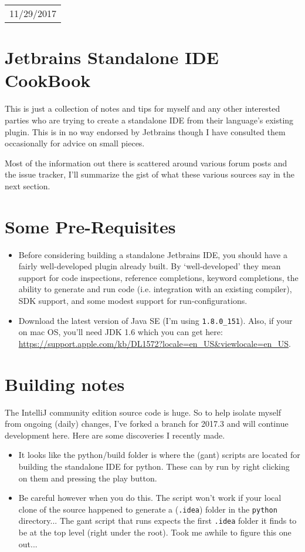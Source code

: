 \documentclass{article}[10pt]
\begin{document}
\null\hfill\begin{tabular}[t]{l@{}}
  11/29/2017
\end{tabular}

\section{Jetbrains Standalone IDE CookBook}

This is just a collection of notes and tips for myself and any other interested parties who are trying to create a standalone IDE from their language's existing plugin. This is in no way endorsed by Jetbrains though I have consulted them occasionally for advice on small pieces. 

Most of the information out there is scattered around various forum posts and the issue tracker, I'll summarize the gist of what these various sources say in the next section.

\section{Some Pre-Requisites}

\begin{itemize}
\item Before considering building a standalone Jetbrains IDE, you should have a fairly well-developed plugin already built. By `well-developed' they mean support for code inspections, reference completions, keyword completions, the ability to generate and run code (i.e. integration with an existing compiler), SDK support, and some modest support for run-configurations.

\item Download the latest version of Java SE (I'm using \verb|1.8.0_151|). Also, if your on mac OS, you'll need JDK 1.6 which you can get here: \url{https://support.apple.com/kb/DL1572?locale=en_US&viewlocale=en_US}.
\end{itemize}

\section{Building notes}

The IntelliJ community edition source code is huge. So to help isolate myself from ongoing (daily) changes, I've forked a branch for 2017.3 and will continue development here. Here are some discoveries I recently made.

\begin{itemize}
\item It looks like the python/build folder is where the (gant) scripts are located for building the standalone IDE for python. These can by run by right clicking on them and pressing the play button.
\item Be careful however when you do this. The script won't work if your local clone of the source happened to generate a (\texttt{.idea}) folder in the \texttt{python} directory... The gant script that runs expects the first \texttt{.idea} folder it finds to be at the top level (right under the root). Took me awhile to figure this one out...
\end{itemize}
\end{document}

